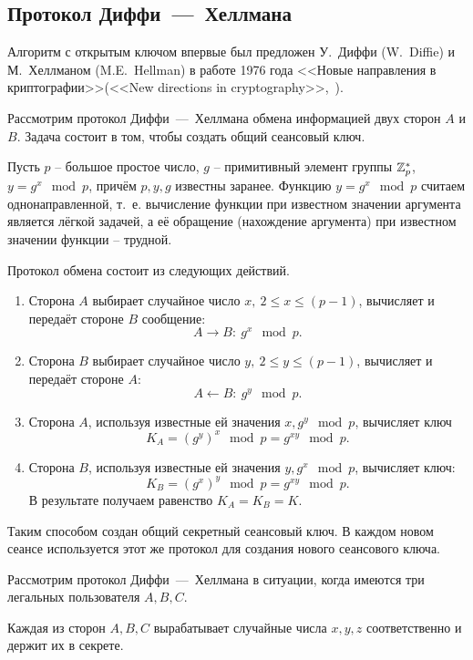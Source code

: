 \subsection{Протокол Диффи~---~Хеллмана}

Алгоритм с открытым ключом впервые был предложен У.~Диффи (W.~Diffie) и М.~Хеллманом (M.E.~Hellman) в работе 1976 года <<Новые направления в криптографии>>(<<New directions in cryptography>>,~\cite{Diffie:Hellman:1976}).

Рассмотрим протокол Диффи~---~Хеллмана обмена информацией двух сторон $A$ и $B$. Задача состоит в том, чтобы создать общий сеансовый ключ.

Пусть $p$ -- большое простое число, $g$ -- примитивный элемент группы $\mathbb{Z}_p^*$, ~ $y = g^x \mod p$, причём $p,y,g$ известны заранее. Функцию $y=g^{x} \mod p$ считаем однонаправленной, т.~е. вычисление функции при известном значении аргумента является лёгкой задачей, а её обращение (нахождение аргумента) при известном значении функции -- трудной.

Протокол обмена состоит из следующих действий.
\begin{enumerate}
    \item Сторона $A$ выбирает случайное число $x, ~ 2 \leq x \leq (p-1)$, вычисляет и передаёт стороне $B$ сообщение:
        \[ A \rightarrow B: ~ g^x \mod p. \]
    \item Сторона $B$ выбирает случайное число $y, ~ 2\leq y \leq (p-1)$, вычисляет и передаёт стороне $A$:
        \[ A \leftarrow B: ~ g^y \mod p. \]
    \item Сторона $A$, используя известные ей значения $x,g^{y} \mod p$, вычисляет ключ
        \[ K_{A} =(g^{y})^{x}\mod p=g^{xy} \mod p. \]
    \item Сторона $B$, используя известные ей значения $y,g^{x} \mod p$, вычисляет ключ:
        \[ K_{B} =(g^{x})^{y}\mod p=g^{xy}\mod p. \]
        В результате получаем равенство $K_A = K_B = K$.
\end{enumerate}

Таким способом создан общий секретный сеансовый ключ. В каждом новом сеансе используется этот же протокол для создания нового сеансового ключа.

Рассмотрим протокол Диффи~---~Хеллмана в ситуации, когда имеются три легальных пользователя $A,B,C$.

Каждая из сторон $A,B,C$ вырабатывает случайные числа $x,y,z$ соответственно и держит их в секрете.


